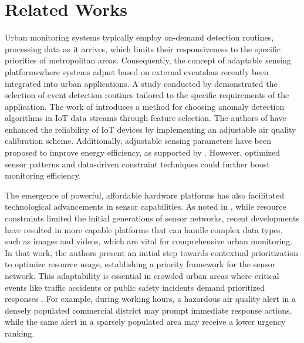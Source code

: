 \documentclass[conference]{IEEEtran}
\begin{document}
\section{Related Works}
\label{sec:fuzzy}
Urban monitoring systems typically employ on-demand detection routines, processing data as it arrives, which limits their responsiveness to the specific priorities of metropolitan areas. Consequently, the concept of adaptable sensing platforms\textemdash where systems adjust based on external events\textemdash has recently been integrated into urban applications. A study conducted by \cite{faverjonChoosingBestAlgorithm2018} demonstrated the selection of event detection routines tailored to the specific requirements of the application. The work of \cite{yangAnomalyDetectionAlgorithm2021} introduces a method for choosing anomaly detection algorithms in IoT data streams through feature selection. The authors of \cite{hashmyModularAirQuality2023} have enhanced the reliability of IoT devices by implementing an adjustable air quality calibration scheme. Additionally, adjustable sensing parameters have been proposed to improve energy efficiency, as supported by \cite{yiModularPlugAndPlaySensor2018}. However, optimized sensor patterns and data-driven constraint techniques could further boost monitoring efficiency. 

The emergence of powerful, affordable hardware platforms has also facilitated technological advancements in sensor capabilities. As noted in \cite{costaPrioritizationApproachOptimization2020}, while resource constraints limited the initial generations of sensor networks, recent developments have resulted in more capable platforms that can handle complex data types, such as images and videos, which are vital for comprehensive urban monitoring. In that work, the authors present an initial step towards contextual prioritization to optimize resource usage, establishing a priority framework for the sensor network. This adaptability is essential in crowded urban areas where critical events like traffic accidents or public safety incidents demand prioritized responses \cite{costaSurveyEmergenciesManagement2022}. For example, during working hours, a hazardous air quality alert in a densely populated commercial district may prompt immediate response actions, while the same alert in a sparsely populated area may receive a lower urgency ranking.
\end{document}
